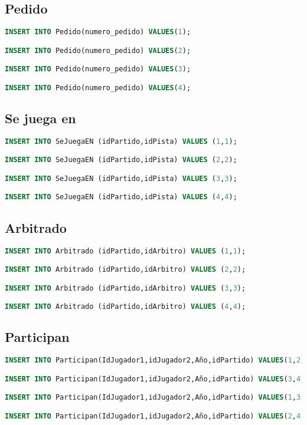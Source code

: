 \subsection{Pedido}
\begin{lstlisting}[language=sql]
INSERT INTO Pedido(numero_pedido) VALUES(1);

INSERT INTO Pedido(numero_pedido) VALUES(2);

INSERT INTO Pedido(numero_pedido) VALUES(3);

INSERT INTO Pedido(numero_pedido) VALUES(4);
\end{lstlisting}

\subsection{Se juega en}
\begin{lstlisting}[language=sql]
INSERT INTO SeJuegaEN (idPartido,idPista) VALUES (1,1);

INSERT INTO SeJuegaEN (idPartido,idPista) VALUES (2,2);

INSERT INTO SeJuegaEN (idPartido,idPista) VALUES (3,3);

INSERT INTO SeJuegaEN (idPartido,idPista) VALUES (4,4);
\end{lstlisting}

\subsection{Arbitrado}
\begin{lstlisting}[language=sql]
INSERT INTO Arbitrado (idPartido,idArbitro) VALUES (1,1);

INSERT INTO Arbitrado (idPartido,idArbitro) VALUES (2,2);

INSERT INTO Arbitrado (idPartido,idArbitro) VALUES (3,3);

INSERT INTO Arbitrado (idPartido,idArbitro) VALUES (4,4);
\end{lstlisting}

\subsection{Participan}
\begin{lstlisting}[language=sql]
INSERT INTO Participan(IdJugador1,idJugador2,Año,idPartido) VALUES(1,2,2020,2);

INSERT INTO Participan(IdJugador1,idJugador2,Año,idPartido) VALUES(3,4,2020,1);

INSERT INTO Participan(IdJugador1,idJugador2,Año,idPartido) VALUES(1,3,2016,3);

INSERT INTO Participan(IdJugador1,idJugador2,Año,idPartido) VALUES(2,4,2019,4);
\end{lstlisting}

